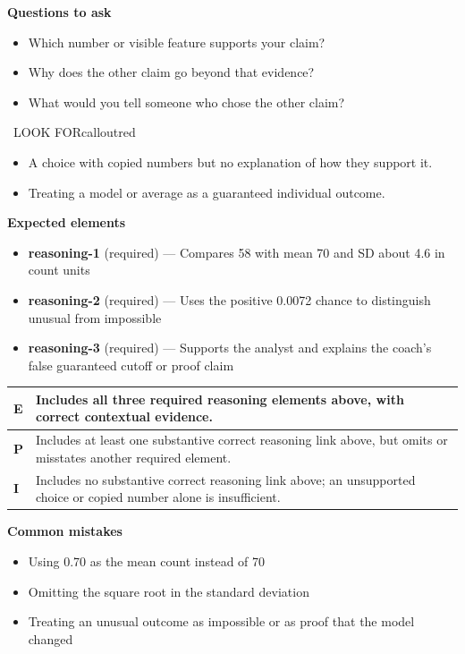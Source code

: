 \documentclass[11pt]{article}
\begin{document}
\textbf{Questions to ask}
\begin{itemize}[leftmargin=1.5em,itemsep=2pt,topsep=2pt]
  \item Which number or visible feature supports your claim?
  \item Why does the other claim go beyond that evidence?
  \item What would you tell someone who chose the other claim?
\end{itemize}

\begin{callout}{\IconWarn\ LOOK FOR}{calloutred}
\begin{itemize}[leftmargin=1.5em,itemsep=2pt,topsep=2pt]
  \item A choice with copied numbers but no explanation of how they support it.
  \item Treating a model or average as a guaranteed individual outcome.
\end{itemize}
\end{callout}


\textbf{Expected elements}
\begin{itemize}[leftmargin=1.5em,itemsep=2pt,topsep=2pt]
  \item \textbf{reasoning-1} (required) --- Compares 58 with mean 70 and SD about 4.6 in count units
  \item \textbf{reasoning-2} (required) --- Uses the positive 0.0072 chance to distinguish unusual from impossible
  \item \textbf{reasoning-3} (required) --- Supports the analyst and explains the coach's false guaranteed cutoff or proof claim
\end{itemize}

{\small\renewcommand{\arraystretch}{1.25}
\noindent\begin{tabular}{|p{0.5in}|p{5.9in}|}
\hline
\textbf{E} & Includes all three required reasoning elements above, with correct contextual evidence. \\ \hline
\textbf{P} & Includes at least one substantive correct reasoning link above, but omits or misstates another required element. \\ \hline
\textbf{I} & Includes no substantive correct reasoning link above; an unsupported choice or copied number alone is insufficient. \\ \hline
\end{tabular}}

\textbf{Common mistakes}
\begin{itemize}[leftmargin=1.5em,itemsep=2pt,topsep=2pt]
  \item Using 0.70 as the mean count instead of 70
  \item Omitting the square root in the standard deviation
  \item Treating an unusual outcome as impossible or as proof that the model changed
\end{itemize}
\end{document}
